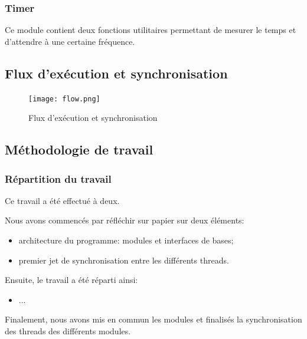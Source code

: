 \documentclass[11pt, a4paper]{article}
\begin{document}
\subsubsection{Timer}
Ce module contient deux fonctions utilitaires permettant de mesurer le temps et
d'attendre à une certaine fréquence.

\newpage

\subsection{Flux d'exécution et synchronisation}

\begin{figure}[H]
    \begin{center}
        \texttt{[image: flow.png]}
    \end{center}
    \caption{Flux d'exécution et synchronisation}
    \label{Flux d'exécution et synchronisation}
\end{figure}

\newpage

\subsection{Méthodologie de travail}
\subsubsection{Répartition du travail}

Ce travail a été effectué à deux.

Nous avons commencés par réfléchir sur papier sur deux éléments:

\begin{itemize}
    \item architecture du programme: modules et interfaces de bases;
    \item premier jet de synchronisation entre les différents threads. \\
\end{itemize}

Ensuite, le travail a été réparti ainsi:
\begin{itemize}
    \item ... \\
\end{itemize}

Finalement, nous avons mis en commun les modules et finalisés la synchronisation des threads des différents modules.

\newpage
\end{document}
